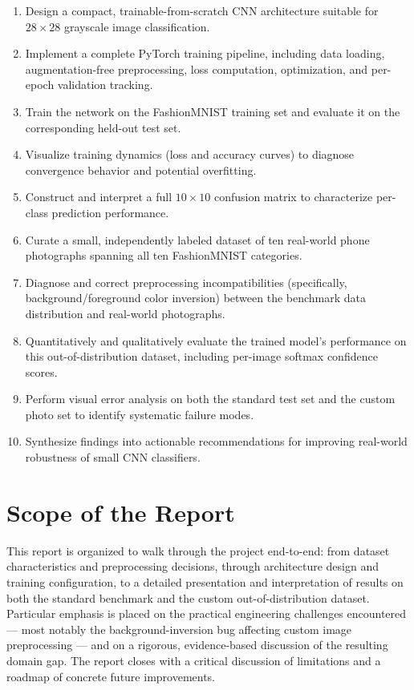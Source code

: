 \documentclass[12pt,a4paper]{report}
\begin{document}
\begin{enumerate}[label=\arabic*.]
    \item Design a compact, trainable-from-scratch CNN architecture suitable for $28\times28$ grayscale image classification.
    \item Implement a complete PyTorch training pipeline, including data loading, augmentation-free preprocessing, loss computation, optimization, and per-epoch validation tracking.
    \item Train the network on the FashionMNIST training set and evaluate it on the corresponding held-out test set.
    \item Visualize training dynamics (loss and accuracy curves) to diagnose convergence behavior and potential overfitting.
    \item Construct and interpret a full $10\times10$ confusion matrix to characterize per-class prediction performance.
    \item Curate a small, independently labeled dataset of ten real-world phone photographs spanning all ten FashionMNIST categories.
    \item Diagnose and correct preprocessing incompatibilities (specifically, background/foreground color inversion) between the benchmark data distribution and real-world photographs.
    \item Quantitatively and qualitatively evaluate the trained model's performance on this out-of-distribution dataset, including per-image softmax confidence scores.
    \item Perform visual error analysis on both the standard test set and the custom photo set to identify systematic failure modes.
    \item Synthesize findings into actionable recommendations for improving real-world robustness of small CNN classifiers.
\end{enumerate}

\section{Scope of the Report}
This report is organized to walk through the project end-to-end: from dataset characteristics and preprocessing decisions, through architecture design and training configuration, to a detailed presentation and interpretation of results on both the standard benchmark and the custom out-of-distribution dataset. Particular emphasis is placed on the practical engineering challenges encountered — most notably the background-inversion bug affecting custom image preprocessing — and on a rigorous, evidence-based discussion of the resulting domain gap. The report closes with a critical discussion of limitations and a roadmap of concrete future improvements.
\end{document}
